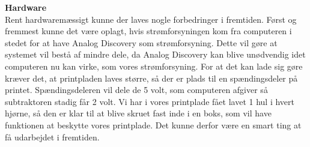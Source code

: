 \textbf{Hardware}
\\Rent hardwaremæssigt kunne der laves nogle forbedringer i fremtiden. Først og fremmest kunne det være oplagt, hvis strømforsyningen kom fra computeren i stedet for at have Analog Discovery som strømforsyning. Dette vil gøre at systemet vil bestå af mindre dele, da Analog Discovery kan blive unødvendig idet computeren nu kan virke, som vores strømforsyning. For at det kan lade sig gøre kræver det, at printpladen laves større, så der er plads til en spændingsdeler på printet. Spændingsdeleren vil dele de 5 volt, som computeren afgiver så subtraktoren stadig får 2 volt.
Vi har i vores printplade fået lavet 1 hul i hvert hjørne, så den er klar til at blive skruet fast inde i en boks, som vil have funktionen at beskytte vores printplade. Det kunne derfor være en smart ting at få udarbejdet i fremtiden.